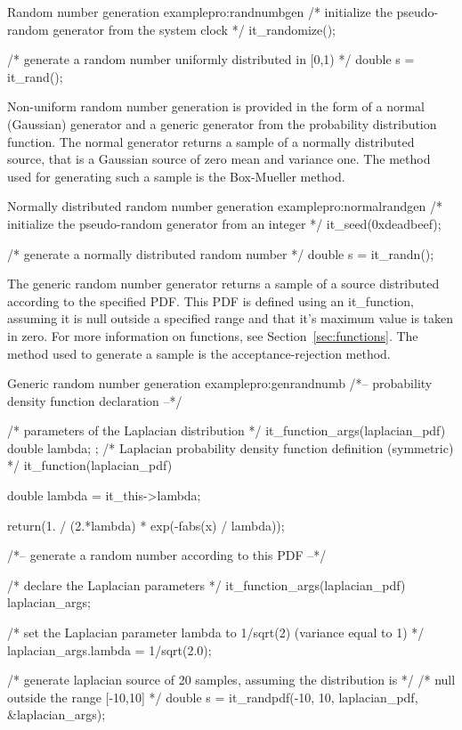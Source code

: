 \begin{program}{Random number generation example}{pro:randnumbgen}
/* initialize the pseudo-random generator from the system clock */
it_randomize();

/* generate a random number uniformly distributed in [0,1) */
double s = it_rand();
\end{program}

    Non-uniform random number generation is provided in the form of a
    normal (Gaussian) generator and a generic generator from the
    probability distribution function. The normal generator returns a
    sample of a normally distributed source, that is a Gaussian source
    of zero mean and variance one. The method used for generating such
    a sample is the Box-Mueller method.

\begin{program}{Normally distributed random number generation example}{pro:normalrandgen}
/* initialize the pseudo-random generator from an integer */
it_seed(0xdeadbeef);

/* generate a normally distributed random number */
double s = it_randn();
\end{program}

    The generic random number generator  returns a sample of a
    source distributed according to the specified PDF. This PDF is
    defined using an it\_function, assuming it is null outside a
    specified range and that it's maximum value is taken in zero. For
    more information on functions, see Section~\ref{sec:functions}. The
    method used to generate a sample is the acceptance-rejection
    method.

\begin{program}{Generic random number generation example}{pro:genrandnumb}
/*-- probability density function declaration --*/

/* parameters of the Laplacian distribution */
it_function_args(laplacian_pdf) {
  double lambda;
};
/* Laplacian probability density function definition (symmetric) */
it_function(laplacian_pdf)
{
  double lambda = it_this->lambda;

  return(1. / (2.*lambda) * exp(-fabs(x) / lambda));
}

/*-- generate a random number according to this PDF --*/

/* declare the Laplacian parameters */
it_function_args(laplacian_pdf) laplacian_args;

/* set the Laplacian parameter lambda to 1/sqrt(2) (variance equal to 1) */
laplacian_args.lambda = 1/sqrt(2.0);

/* generate laplacian source of 20 samples, assuming the distribution is */
/* null outside the range [-10,10]                                       */
double s = it_randpdf(-10, 10, laplacian_pdf, &laplacian_args);
\end{program}


